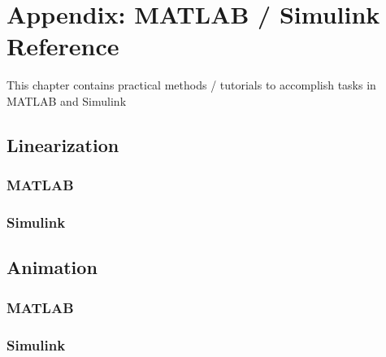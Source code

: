 \documentclass[../notes.tex]{subfiles}
\begin{document}
\section{Appendix: MATLAB / Simulink Reference}
This chapter contains practical methods / tutorials to accomplish tasks in MATLAB and Simulink

\subsection{Linearization}
\subsubsection{MATLAB}
\subsubsection{Simulink}

\subsection{Animation}
\subsubsection{MATLAB}
\subsubsection{Simulink}
\end{document}
